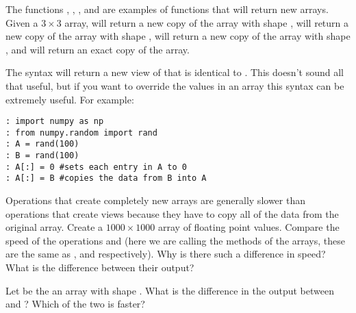 The functions , , , and  are examples of functions that will return new arrays.
Given a $3 \times 3$ array,  will return a new copy of the array with shape ,  will return a new copy of the array with shape ,  will return a new copy of the array  with shape , and  will return an exact copy of the array.

The syntax  will return a new view of  that is identical to .
This doesn't sound all that useful, but if you want to override the values in an array this syntax can be extremely useful.
For example:
\begin{lstlisting}
: import numpy as np
: from numpy.random import rand
: A = rand(100)
: B = rand(100)
: A[:] = 0 #sets each entry in A to 0
: A[:] = B #copies the data from B into A
\end{lstlisting}

\begin{problem}
Operations that create completely new arrays are generally slower than operations that create views because they have to copy all of the data from the original array.
Create a $1000 \times 1000$ array  of floating point values.
Compare the speed of the operations  and  (here we are calling the methods of the arrays, these are the same as , and  respectively).
Why is there such a difference in speed?
What is the difference between their output?
\end{problem}

\begin{problem}
Let  be the an array with shape .
What is the difference in the output between  and ?
Which of the two is faster?
\end{problem}

